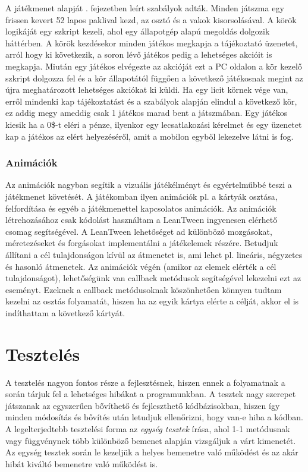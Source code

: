 \documentclass[]{thesis-ekf}
\theoremstyle{definition}
\theoremstyle{remark}
\begin{document}
A játékmenet alapját . fejezetben leírt szabályok adták. Minden játszma egy frissen kevert 52 lapos paklival kezd, az osztó és a vakok kisorsolásával. A körök logikáját egy szkript kezeli, ahol egy állapotgép alapú megoldás dolgozik háttérben. A körök kezdésekor minden játékos megkapja a tájékoztató üzenetet, arról hogy ki következik, a soron lévő játékos pedig a lehetséges akcióit is megkapja. Miután egy játékos elvégezte az akcióját ezt a PC oldalon a kör kezelő szkript dolgozza fel és a kör állapotától függően a következő játékosnak megint az újra meghatározott lehetséges akciókat ki küldi. Ha egy licit körnek vége van, erről mindenki kap tájékoztatást és a szabályok alapján elindul a következő kör, ez addig megy ameddig csak 1 játékos marad bent a játszmában. Egy játékos kiesik ha a 0\$-t eléri a pénze, ilyenkor egy lecsatlakozási kérelmet és egy üzenetet kap a játékos az elért helyezéséről, amit a mobilon egyből lekezelve látni is fog.

\subsection{Animációk}

Az animációk nagyban segítik a vizuális játékélményt és egyértelműbbé teszi a játékmenet követését. A játékomban ilyen animációk pl. a kártyák osztása, felfordítása és egyéb a játékmenettel kapcsolatos animációk. Az animációk létrehozásához csak kódolást használtam a LeanTween \cite{UnityLeanTween} ingyenesen elérhető csomag segítségével. A LeanTween lehetőséget ad különböző mozgásokat, méretezéseket és forgásokat implementálni a játékelemek részére. Betudjuk állítani a cél tulajdonságon kívül az átmenetet is, ami lehet pl. lineáris, négyzetes és hasonló átmenetek. Az animációk végén (amikor az elemek elérték a cél tulajdonságot), lehetőségünk van callback metódusok segítségével lekezelni ezt az eseményt. Ezeknek a callback metódusoknak köszönhetően könnyen tudtam kezelni az osztás folyamatát, hiszen ha az egyik kártya elérte a célját, akkor el is indíthattam a következő kártyát.

\chapter{Tesztelés}

A tesztelés nagyon fontos része a fejlesztésnek, hiszen ennek a folyamatnak a során tárjuk fel a lehetséges hibákat a programunkban. A tesztek nagy szerepet játszanak az egyszerűen bővíthető és fejleszthető kódbázisokban, hiszen így minden módosítás és bővítés után letudjuk ellenőrizni, hogy van-e hiba a kódban. A legelterjedtebb tesztelési forma az \emph{egység tesztek} írása, ahol 1-1 metódusnak vagy függvénynek több különböző bemenet alapján vizsgáljuk a várt kimenetét. Az egység tesztek során le kezeljük a helyes bemenetre való működést és az akár hibát kiváltó bemenetre való működést is. 
\end{document}
